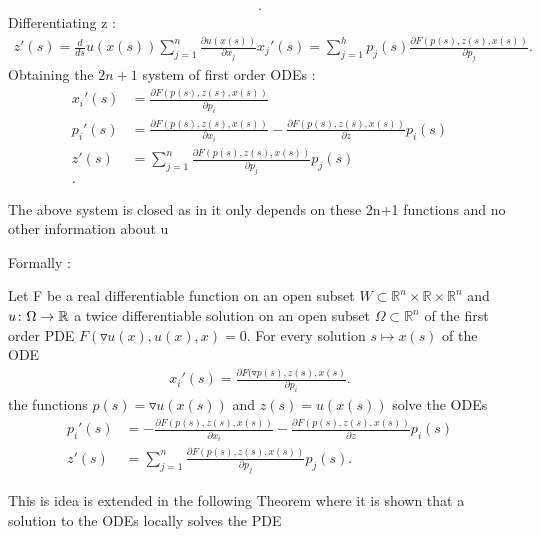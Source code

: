 \begin{example}
\begin{align*}
 .\end{align*}
 Differentiating z : 
 \begin{align*}
   z'(s) = \frac{d}{ds}u(x(s)) \sum_{j=1}^n \frac{\partial u(x(s))}{\partial x_j} x_j'(s) = \sum_{j=1}^h p_j(s) \frac{\partial F(p(s),z(s),x(s))}{\partial p_j} 
 .\end{align*}
Obtaining the $2n+1$ system of first order ODEs : 
\begin{align*}
  x_{i}'(s) &=   \frac{\partial F(p(s),z(s),x(s))}{\partial p_i} \\
  p_{i}'(s) &=   \frac{\partial F(p(s),z(s),x(s))}{\partial x_i} -  \frac{\partial F(p(s),z(s),x(s))}{\partial z}p_i(s)\\
  z'(s) &=   \sum_{j=1}^n \frac{\partial F(p(s),z(s),x(s))}{\partial p_j} p_j(s) \\
.\end{align*}
\end{example}
\begin{corollary}
 The above system is closed as in it only depends on these 2n+1 functions and no other information about u 
\end{corollary}
Formally : 
\begin{theorem}
  Let F be a real differentiable function on an open subset $W \subset  \mathbb{R}^{n}\times \mathbb{R}\times \mathbb{R}^{n} $ 
  and $u \colon  \Omega \to \mathbb{R} $ a twice differentiable solution on an open subset $\Omega  \subset  \mathbb{R}^{n} $ of the first order PDE 
  $F(\triangledown u(x),u(x),x)=0$. For every solution $s \mapsto x(s)$ of the ODE 
  \begin{align*}
    x_i'(s) = \frac{\partial F(\triangledown p(s),z(s),x(s)}{\partial p_i} 
  .\end{align*}
  the functions $p(s)=\triangledown u(x(s))$ and $z(s)=u(x(s))$ solve the ODEs
  \begin{align*}
    p_i'(s) &= - \frac{\partial F(p(s),z(s),x(s))}{\partial x_{i}} - \frac{\partial F(p(s),z(s),x(s))}{\partial z} p_i(s)    \\
    z'(s) &= \sum_{j=1}^{n}  \frac{\partial F(p(s),z(s),x(s))}{\partial p_{j}}p_j(s) 
  .\end{align*}
\end{theorem}
\begin{comment}
  Note that the order of the theorem is $\text{Solution to pde } \implies \text{ Solution to ode}$ 
\end{comment}
This is idea is extended in the following Theorem where it is shown that a solution to the ODEs locally solves the PDE
